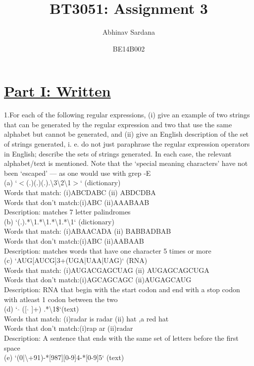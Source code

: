 \documentclass[8pt,a4paper]{article}
\title{BT3051: Assignment 3}
\author{Abhinav Sardana}
\date{BE14B002}
\begin{document}
\maketitle
\section*{\centering \underline{Part I: Written}}
1.For each of the following regular expressions, (i) give an example of two strings that
can be generated by the regular expression and two that use the same alphabet but cannot be
generated, and (ii) give an English description of the set of strings generated, i. e. do not just
paraphrase the regular expression operators in English; describe the sets of strings generated. In
each case, the relevant alphabet/text is mentioned. Note that the ‘special meaning characters’
have not been ‘escaped’ — as one would use with grep -E\\
(a) `$<$(.)(.)(.).\textbackslash3\textbackslash2\textbackslash1$>$` (dictionary)\\
Words that match: (i)ABCDABC (ii) ABDCDBA\\
Words that don't match:(i)ABC (ii)AAABAAB\\
Description: matches 7 letter palindromes\\
(b) `(.).*\textbackslash1.*\textbackslash1.*\textbackslash1.*\textbackslash1` (dictionary)\\
Words that match: (i)ABAACADA (ii) BABBADBAB\\
Words that don't match:(i)ABC (ii)AABAAB\\
Description: matches words that have one character 5 times or more\\
(c) `AUG[AUCG]{3}+(UGA|UAA|UAG)` (RNA)\\
Words that match: (i)AUGACGAGCUAG (ii) AUGAGCAGCUGA\\
Words that don't match:(i)AGCAGCAGC (ii)AUGAGCAUG\\
Description: RNA that begin with the start codon and end with a stop codon with atleast 1 codon between the two\\
(d) ` $\widehat{   }$ ([ $\widehat{   }$ { }]+) .*\textbackslash1\$`(text)\\
Words that match: (i)radar is radar (ii) hat ,a red hat\\
Words that don't match:(i)rap ar (ii)radar\\
Description: A sentence that ends with the same set of letters before the first space\\
(e) `(0|\textbackslash+91)-*[987][0-9]{4}-*[0-9]{5}` (text)\\
\end{document}
